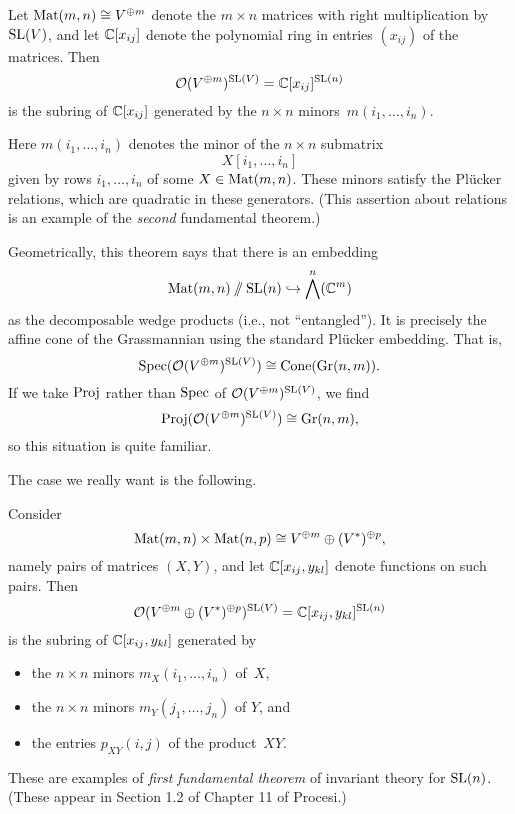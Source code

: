 \documentclass[11pt]{amsart}
\begin{document}
\begin{thm}
Let $\operatorname{Mat}(m,n) \cong V^{\oplus m}$ denote the $m \times n$ matrices with right multiplication by $\operatorname{SL}(V)$, and let $\mathbb C[x_{ij}]$ denote
the polynomial ring in entries $(x_{ij})$ of the matrices.
Then
\[
\mathcal O(V^{\oplus m})^{\operatorname{SL}(V)} = \mathbb C[x_{ij}]^{\operatorname{SL}(n)}
\]
is the subring of $\mathbb C[x_{ij}]$ generated by the $n \times n$ minors~$m(i_1,\ldots, i_n)$.
\end{thm}

Here $m(i_1,\ldots, i_n)$ denotes the minor of the $n \times n$ submatrix 
\[
X[i_1,\ldots,i_n]
\]
given by rows $i_1,\ldots,i_n$ of some $X \in \operatorname{Mat}(m,n)$.
These minors satisfy the Pl\"ucker relations, which are quadratic in these generators.
(This assertion about relations is an example of the {\em second} fundamental theorem.)

Geometrically, this theorem says that there is an embedding
\[
\operatorname{Mat}(m,n)\mathbin{/\mkern-6mu/} \operatorname{SL}(n) \hookrightarrow \bigwedge^n(\mathbb C^m)
\]
as the decomposable wedge products (i.e., not ``entangled'').
It is precisely the affine cone of the Grassmannian using the standard Pl\"ucker embedding.
That is,
\[
\operatorname{Spec}(\mathcal O(V^{\oplus m})^{\operatorname{SL}(V)}) \cong {\rm Cone}({\rm Gr}(n,m)).
\]
If we take $\operatorname{Proj}$ rather than $\operatorname{Spec}$ of $\mathcal O(V^{\oplus m})^{\operatorname{SL}(V)}$, 
we find
\[
\operatorname{Proj}(\mathcal O(V^{\oplus m})^{\operatorname{SL}(V)}) \cong {\rm Gr}(n,m),
\]
so this situation is quite familiar.

The case we really want is the following.

\begin{thm}
\label{FFT}
Consider 
\[
\operatorname{Mat}(m,n) \times \operatorname{Mat}(n,p)\cong V^{\oplus m} \oplus (V^*)^{\oplus p},
\]
namely pairs of matrices $(X,Y)$, and let $\mathbb C[x_{ij}, y_{kl}]$ denote functions on such pairs.
Then
\[
\mathcal O(V^{\oplus m} \oplus (V^*)^{\oplus p})^{\operatorname{SL}(V)} = \mathbb C[x_{ij}, y_{kl}]^{\operatorname{SL}(n)}
\]
is the subring of $\mathbb C[x_{ij}, y_{kl}]$ generated by 
\begin{itemize}
\item the $n \times n$ minors $m_X(i_1,\ldots, i_n)$ of~$X$,
\item the $n \times n$ minors $m_Y(j_1,\ldots, j_n)$ of $Y$, and
\item the entries $p_{XY}(i,j)$ of the product~$XY$.
\end{itemize}
\end{thm}

These are examples of {\em first fundamental theorem} of invariant theory for $\operatorname{SL}(n)$.
(These appear in Section 1.2 of Chapter 11 of Procesi.)
\end{document}
